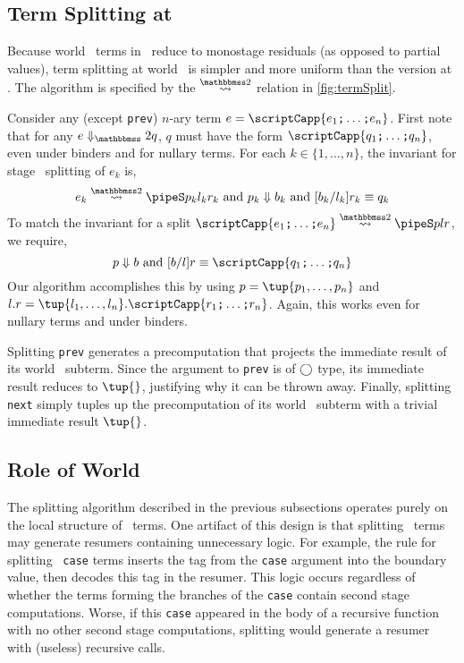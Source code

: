 \begin{abstrsyn}
\subsection{Term Splitting at \bbtwo}

Because world \bbtwo\ terms in \lang\ reduce to monostage residuals (as opposed to partial values),
term splitting at world \bbtwo\ is simpler and more uniform than the version at \bbonem. 
The algorithm is specified by the $\splittwosym$ relation in \cref{fig:termSplit}.

Consider any (except \texttt{prev}) 
$n$-ary term $e = \scriptCapp {e_1 \ttsemi \ldots \ttsemi e_n}$.
First note that for any $\diatwo e q$, $q$ must have the form $\scriptCapp {q_1 \ttsemi \ldots \ttsemi q_n}$,
even under binders and for nullary terms.
For each $k \in \{1,\ldots,n\}$, the invariant for stage \bbtwo\ splitting of $e_k$ is,
\[
	\splittwo {e_k} A {p_k} {l_k} {r_k} \text{ and } \reduce {p_k} {b_k} \text{ and } [{b_k}/{l_k}]{r_k} \equiv {q_k}
\]
To match the invariant for a split $\splittwo {\scriptCapp {e_1 \ttsemi \ldots \ttsemi e_n}} A p l r$, we require,
\[
	\reduce p b \text{ and } [b/l]r \equiv \scriptCapp {q_1 \ttsemi \ldots \ttsemi q_n}
\]
Our algorithm accomplishes this by using $p = \tup {p_1, \ldots, p_n}$ and
$l.r = \tup {l_1, \ldots, l_n}.\scriptCapp {r_1 \ttsemi \ldots \ttsemi r_n}$.
Again, this works even for nullary terms and under binders.

Splitting \texttt{prev} generates a precomputation that projects the immediate
result of its world \bbone\ subterm.
Since the argument to \texttt{prev} is of $\bigcirc$ type, its immediate result reduces to $\tup{}$, justifying why it can be thrown away.
Finally, splitting \texttt{next} simply tuples up the precomputation of its
world \bbtwo\ subterm with a trivial immediate result $\tup{}$.

\subsection {Role of World \bbonep}
\label{sec:needGround}

The splitting algorithm described in the previous subsections operates
purely on the local structure of \lang\ terms.  One artifact of this design
is that splitting \bbonem\ terms may generate resumers containing
unnecessary logic.  For example, the rule for splitting
\bbonem\ \texttt{case} terms inserts the tag from the \texttt{case}
argument into the boundary value, then decodes this tag in the
resumer. This logic occurs regardless of whether the terms forming the
branches of the \texttt{case} contain second stage computations.
Worse, if this \texttt{case} appeared in the body of a recursive
function with no other second stage computations, splitting would
generate a resumer with (useless) recursive calls.


\end{abstrsyn}
